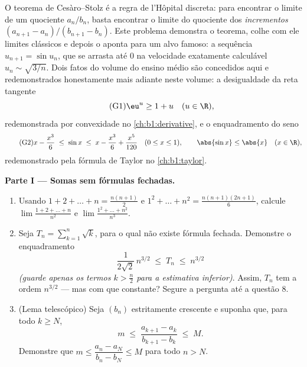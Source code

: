 \begin{problem}[{Problema de fim de semana --- o teorema de Cesàro--Stolz
e a assintótica $u_n \sim \sqrt{3/n}$ para $u_{n+1} = \sin
u_n$}]
\label{pb:b1:seq:1}
O teorema de Cesàro--Stolz é a regra de l'Hôpital discreta: para
encontrar o limite de um quociente $a_n/b_n$, basta encontrar o
limite do quociente dos \emph{incrementos} $(a_{n+1} -
a_n)/(b_{n+1} - b_n)$. Este problema demonstra o teorema, colhe com ele
limites clássicos e depois o aponta para um alvo famoso:
a sequência $u_{n+1} = \sin u_n$, que se arrasta até $0$ na
velocidade exatamente calculável $u_n \sim \sqrt{3/n}$. Dois fatos do volume do ensino
médio são concedidos aqui e redemonstrados honestamente mais adiante
neste volume: a desigualdade da reta tangente
\[
\tag{G1} \eu^{u} \geq 1 + u \quad (u \in \R),
\]
redemonstrada por convexidade no \cref{ch:b1:derivative}, e o enquadramento
do seno
\[
\tag{G2} x - \frac{x^3}{6} \;\leq\; \sin x \;\leq\; x -
\frac{x^3}{6} + \frac{x^5}{120} \quad (0 \leq x \leq 1), \qquad
\abs{\sin x} \leq \abs{x} \quad (x \in \R),
\]
redemonstrado pela fórmula de Taylor no \cref{ch:b1:taylor}.

\medskip
\noindent\textbf{Parte I --- Somas sem fórmulas fechadas.}
\begin{enumerate}
  \item Usando $1 + 2 + \dots + n = \frac{n(n+1)}{2}$ e $1^2 +
        \dots + n^2 = \frac{n(n+1)(2n+1)}{6}$, calcule
        $\lim \frac{1 + 2 + \dots + n}{n^2}$ e $\lim \frac{1^2 +
        \dots + n^2}{n^3}$.
  \item Seja $T_n = \sum_{k=1}^n \sqrt k$, para o qual não existe fórmula
        fechada. Demonstre o enquadramento
        \[
        \frac{1}{2\sqrt 2}\,n^{3/2} \;\leq\; T_n \;\leq\;
        n^{3/2}
        \]
        \emph{(guarde apenas os termos $k > \frac n2$ para a estimativa
        inferior)}. Assim, $T_n$ tem a ordem $n^{3/2}$ --- mas com que
        constante? Segure a pergunta até a questão 8.
  \item (Lema telescópico) Seja $(b_n)$ estritamente crescente e
        suponha que, para todo $k \geq N$,
        \[
        m \;\leq\; \frac{a_{k+1} - a_k}{b_{k+1} - b_k} \;\leq\;
        M .
        \]
        Demonstre que $m \leq \dfrac{a_n - a_N}{b_n - b_N} \leq M$
        para todo $n > N$.
\end{enumerate}


\end{problem}
